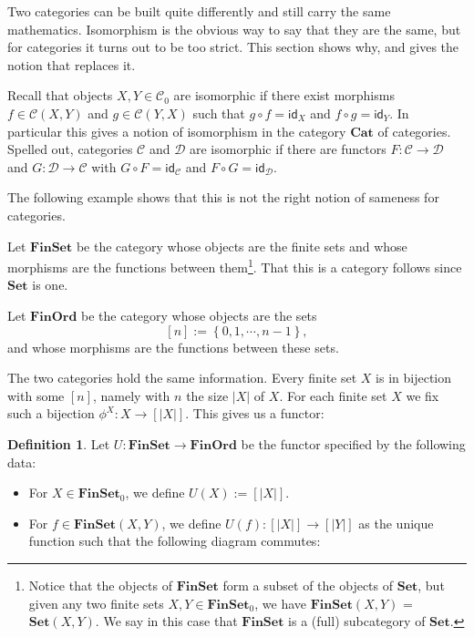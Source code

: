 \documentclass[a4paper,11pt, oneside,titlepage=false]{scrbook}
\theoremstyle{plain}
\theoremstyle{definition}
\newtheorem{dfn}[thm]{Definition}
\newcommand{\cfont}[1]{\ensuremath{\mathsf{#1}}}
\newcommand{\Cat}[1]{\mathcal{#1}}
\newcommand{\CC}{\Cat{C}}
\newcommand{\DD}{\Cat{D}}
\newcommand{\Catb}[1]{\mathbf{#1}}
\newcommand{\SET}{\Catb{Set}}
\newcommand{\FINSET}{\Catb{FinSet}}
\newcommand{\CAT}{\Catb{Cat}}
\newcommand{\Ob}[1]{{#1}_0}
\newcommand{\CHom}[3]{{#1}(#2,#3)}
\newcommand{\Id}[1][]{\cfont{id}_{#1}}
\newcommand{\co}[2]{\ensuremath{#2 \circ #1}}
\begin{document}
Two categories can be built quite differently and still carry the same
mathematics.
Isomorphism is the obvious way to say that they are the same, but for
categories it turns out to be too strict.
This section shows why, and gives the notion that replaces it.

Recall that objects $X,Y\in\Ob{\CC}$ are isomorphic if there exist morphisms $f\in\CHom{\CC}{X}{Y}$ and $g\in\CHom{\CC}{Y}{X}$ such that $\co{f}{g} = \Id[X]$ and $\co{g}{f} = \Id[Y]$.
In particular this gives a notion of isomorphism in the category $\CAT$ of categories.
Spelled out, categories $\CC$ and $\DD$ are isomorphic if there are functors $F:\CC\to\DD$ and $G:\DD\to\CC$ with $\co{F}{G}= \Id[\CC]$ and $\co{G}{F} = \Id[\DD]$.

The following example shows that this is not the right notion of sameness for categories.

Let $\FINSET$ be the category whose objects are the finite sets and whose morphisms are the functions between them\footnote{Notice that the objects of $\FINSET$ form a subset of the objects of $\SET$, but given any two finite sets $X,Y \in \Ob{\FINSET}$, we have $\CHom{\FINSET}{X}{Y}$ = $\CHom{\SET}{X}{Y}$. We say in this case that $\FINSET$ is a (full) subcategory of $\SET$.}.
That this is a category follows since $\SET$ is one.

Let $\Catb{FinOrd}$ be the category whose objects are the sets
\[
[n] := \left\{0,1,\cdots,n-1\right\},
\]
and whose morphisms are the functions between these sets.

The two categories hold the same information.
Every finite set $X$ is in bijection with some $[n]$, namely with $n$ the size $\vert X\vert$ of $X$.
For each finite set $X$ we fix such a bijection $\phi^X: X\to [\vert X\vert]$.
This gives us a functor:
\begin{dfn} Let $U: \FINSET\to \Catb{FinOrd}$ be the functor specified by the following data:
\begin{itemize}
\item For $X\in \Ob{\FINSET}$, we define $U(X) := [\vert X\vert]$.
\item For $f\in \CHom{\FINSET}{X}{Y}$, we define $U(f): [\vert X\vert]\to [\vert Y\vert]$ as the unique function such that the following diagram commutes:
\begin{center}
\end{center}
\end{itemize}
\end{dfn}
\end{document}
